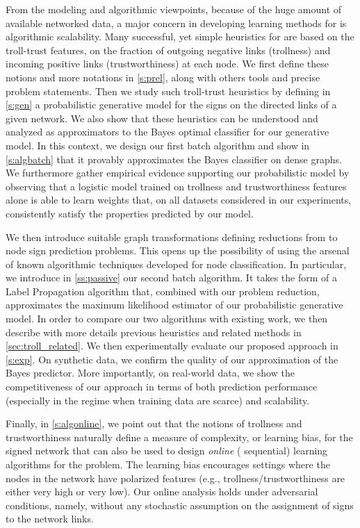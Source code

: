 From the modeling and algorithmic viewpoints, because of the huge amount of available networked
data, a major concern in developing learning methods for \esp{} is algorithmic
scalability. Many successful, yet simple heuristics for \esp{} are based on the
troll-trust features, \ie{} on the fraction of outgoing negative links (trollness) and incoming
positive links (trustworthiness) at each node. We first define these notions and more notations in
\autoref{s:prel}, along with others tools and precise problem statements. Then we study such
troll-trust heuristics by defining in \autoref{s:gen} a probabilistic
generative model for the signs on the directed links of a given network. We also show that these
heuristics can be understood and analyzed as approximators to the Bayes optimal classifier for our
generative model. In this context, we design our first batch algorithm and show in
\autoref{s:algbatch} that it provably approximates the Bayes classifier on dense graphs.
We furthermore gather empirical evidence supporting our probabilistic model by observing
that a logistic model trained on trollness and trustworthiness features alone is able to learn
weights that, on all datasets considered in our experiments, consistently satisfy the properties
predicted by our model.

We then introduce suitable graph transformations defining reductions from \esp{} to
node sign prediction problems. This opens up the possibility of using the arsenal of known
algorithmic techniques developed for node classification. In particular, we introduce in
\autoref{ss:passive} our second batch algorithm. It takes the form of a Label
Propagation algorithm that, combined with our problem reduction, approximates the maximum likelihood
estimator of our probabilistic generative model.
In order to compare our two algorithms with existing work, we then describe with more details
previous heuristics and related methods in \autoref{sec:troll_related}.
We then experimentally evaluate our proposed approach in \autoref{s:exp}. On synthetic data, we
confirm the quality of our approximation of the Bayes predictor. More importantly, on real-world
data, we show the competitiveness of our approach in terms of both prediction performance
(especially in the regime when training data are scarce) and scalability.

Finally, in \autoref{s:algonline}, we point out that the notions of trollness and trustworthiness
naturally define a measure
of complexity, or learning bias, for the signed network that can also be used to design
\emph{online} (\ie{} sequential) learning algorithms for the \esp{} problem. The
learning bias encourages settings where the nodes in the network have polarized features (e.g.,
trollness/trustworthiness are either very high or very low). Our online analysis holds under
adversarial conditions, namely, without any stochastic assumption on the assignment of signs to the
network links.
